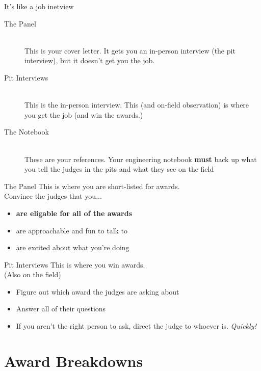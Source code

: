 \documentclass{beamer}
\begin{document}
  \begin{frame}{It's like a job inetview}
    \begin{description}
    \item[The Panel] \hfill \\
      This is your cover letter. It gets you an in-person interview
      (the pit interview), but it doesn't get you the job.
      \pause
    \item[Pit Interviews] \hfill \\
      This is the in-person interview. This (and on-field observation)
      is where you get the job (and win the awards.)
      \pause
    \item[The Notebook] \hfill \\
      These are your references. Your engineering notebook \textbf{must}
      back up what you tell the judges in the pits and what they see
      on the field
    \end{description}
  \end{frame}

  \begin{frame}{The Panel}
    \large{This is where you are short-listed for awards.}
    \\
    \pause
    Convince the judges that you... \pause
    \begin{itemize}
    \item \textbf{are eligable for all of the awards} \pause
    \item are approachable and fun to talk to \pause
    \item are excited about what you're doing
    \end{itemize}
  \end{frame}

  \begin{frame}{Pit Interviews}
    \large{This is where you win awards.}
    \\
    \pause
    \small{(Also on the field)}
    \pause
    \begin{itemize}
    \item Figure out which award the judges are asking about \pause
    \item Answer all of their questions \pause
    \item If you aren't the right person to ask, direct the judge to whoever is.
      \pause
      \textit{Quickly!}
    \end{itemize}
  \end{frame}

  \section{Award Breakdowns}
\end{document}
